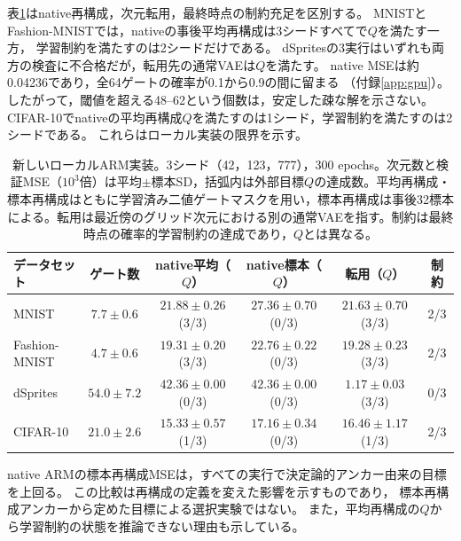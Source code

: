 \documentclass[11pt,a4paper]{ltjsarticle}
\begin{document}
表\ref{tab:armnew}はnative再構成，次元転用，最終時点の制約充足を区別する。
MNISTとFashion-MNISTでは，nativeの事後平均再構成は3シードすべてで$Q$を満たす一方，
学習制約を満たすのは2シードだけである。
dSpritesの3実行はいずれも両方の検査に不合格だが，転用先の通常VAEは$Q$を満たす。
native MSEは約0.04236であり，全64ゲートの確率が0.1から0.9の間に留まる
（付録\ref{app:gpu}）。
したがって，閾値を超える48--62という個数は，安定した疎な解を示さない。
CIFAR-10でnativeの平均再構成$Q$を満たすのは1シード，学習制約を満たすのは2シードである。
これらはローカル実装の限界を示す。
\begin{table}[H]
\caption{新しいローカルARM実装。3シード（42，123，777），300 epochs。次元数と検証MSE（$10^3$倍）は平均$\pm$標本SD，括弧内は外部目標$Q$の達成数。平均再構成・標本再構成はともに学習済み二値ゲートマスクを用い，標本再構成は事後32標本による。転用は最近傍のグリッド次元における別の通常VAEを指す。制約は最終時点の確率的学習制約の達成であり，$Q$とは異なる。}\label{tab:armnew}
\footnotesize
\setlength{\tabcolsep}{3pt}
\begin{tabular*}{\textwidth}{@{\extracolsep{\fill}}lccccc@{}}
\toprule
データセット & ゲート数 & native平均（$Q$） & native標本（$Q$） & 転用（$Q$） & 制約 \\
\midrule
MNIST & $7.7 \pm 0.6$ & $21.88 \pm 0.26$ (3/3) & $27.36 \pm 0.70$ (0/3) & $21.63 \pm 0.70$ (3/3) & 2/3 \\
Fashion-MNIST & $4.7 \pm 0.6$ & $19.31 \pm 0.20$ (3/3) & $22.76 \pm 0.22$ (0/3) & $19.28 \pm 0.23$ (3/3) & 2/3 \\
dSprites & $54.0 \pm 7.2$ & $42.36 \pm 0.00$ (0/3) & $42.36 \pm 0.00$ (0/3) & $1.17 \pm 0.03$ (3/3) & 0/3 \\
CIFAR-10 & $21.0 \pm 2.6$ & $15.33 \pm 0.57$ (1/3) & $17.16 \pm 0.34$ (0/3) & $16.46 \pm 1.17$ (1/3) & 2/3 \\
\bottomrule\end{tabular*}
\end{table}

native ARMの標本再構成MSEは，すべての実行で決定論的アンカー由来の目標を上回る。
この比較は再構成の定義を変えた影響を示すものであり，
標本再構成アンカーから定めた目標による選択実験ではない。
また，平均再構成の$Q$から学習制約の状態を推論できない理由も示している。
\end{document}
